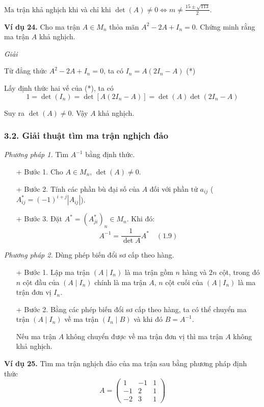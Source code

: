 Ma trận khả nghịch khi và chỉ khi \(\det(A) \neq 0 \Leftrightarrow m \neq \frac{15 \pm \sqrt{113}}{2} \).

\textbf{Ví dụ 24.} Cho ma trận \( A \in M_n \) thỏa mãn \( A^2 - 2A + I_n = 0 \). Chứng minh rằng ma trận \( A \) khả nghịch.

\textit{Giải}

Từ đẳng thức \( A^2 - 2A + I_n = 0 \), ta có \( I_n = A(2I_n - A) \) (*)

Lấy định thức hai vế của (*), ta có
\[
1 = \det(I_n) = \det[A(2I_n - A)] = \det(A)\det(2I_n - A)
\]

Suy ra \(\det(A) \neq 0\). Vậy \( A \) khả nghịch.

\subsubsection*{3.2. Giải thuật tìm ma trận nghịch đảo}

\textit{Phương pháp 1.} Tìm \( A^{-1} \) bằng định thức.
\begin{itemize}
    \item[+] Bước 1. Cho \( A \in M_n \), \(\det(A) \neq 0\).
    \item[+] Bước 2. Tính các phần bù đại số của \(A\) đối với phần tử \(a_{ij}\) (\(A_{ij}^* = (-1)^{i+j} \left|A_{ij}\right|\)).
    \item[+] Bước 3. Đặt \(A^* = (A_{ji}^*)_n \in M_n\). Khi đó:
    \[
    A^{-1} = \frac{1}{\det A} A^* \quad (1.9)
    \]
\end{itemize}
    
\textit{Phương pháp 2.} Dùng phép biến đổi sơ cấp theo hàng.
\begin{itemize}
    \item[+] Bước 1. Lập ma trận \((A \mid I_n)\) là ma trận gồm \(n\) hàng và \(2n\) cột, trong đó \(n\) cột đầu của \((A \mid I_n)\) chính là ma trận \(A\), \(n\) cột cuối của \((A \mid I_n)\) là ma trận đơn vị \(I_n\).
    \item[+] Bước 2. Bằng các phép biến đổi sơ cấp theo hàng, ta có thể chuyển ma trận \((A \mid I_n)\) về ma trận \((I_n \mid B)\) và khi đó \(B = A^{-1}\).

    Nếu ma trận \(A\) không chuyển được về ma trận đơn vị thì ma trận \(A\) không khả nghịch.
\end{itemize}

\textbf{Ví dụ 25.} Tìm ma trận nghịch đảo của ma trận sau bằng phương pháp định thức
\[
A = \begin{pmatrix}
1 & -1 & 1 \\
-1 & 2 & 1 \\
-2 & 3 & 1
\end{pmatrix}
\]

